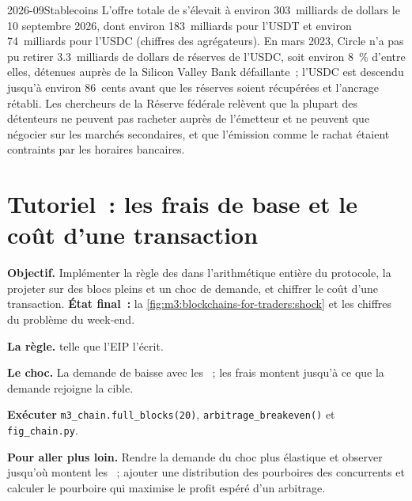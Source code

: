 \begin{dated}{2026-09}{Stablecoins}\label{dat:m3:blockchains-for-traders:stable}
L'offre totale de  s'élevait à environ 303~milliards de dollars le 10 septembre 2026, dont environ 183~milliards pour l'USDT et
environ 74~milliards pour l'USDC (chiffres des agrégateurs). En mars 2023, Circle n'a pas pu retirer 3.3~milliards de dollars de réserves de l'USDC,
soit environ 8~\% d'entre elles, détenues auprès de la Silicon Valley Bank défaillante~; l'USDC est descendu jusqu'à environ 86~cents avant que
les réserves soient récupérées et l'ancrage rétabli. Les chercheurs de la Réserve fédérale relèvent que la plupart des détenteurs
ne peuvent pas racheter auprès de l'émetteur et ne peuvent que négocier sur les marchés secondaires, et que l'émission comme le rachat étaient contraints
par les horaires bancaires.
\end{dated}

\section{Tutoriel~: les frais de base et le coût d'une transaction}\label{tut:m3:blockchains-for-traders:gas}

\begin{tutorial}
\textbf{Objectif.} Implémenter la règle des  dans l'arithmétique entière du protocole, la projeter sur des blocs pleins
et un choc de demande, et chiffrer le coût d'une transaction. \textbf{État final~:}
la \cref{fig:m3:blockchains-for-traders:shock} et les chiffres du problème du week-end.
\begin{tutsteps}
\item \textbf{La règle.}  telle que l'EIP l'écrit.
\label{lst:m3:blockchains-for-traders:basefee}
\item \textbf{Le choc.} La demande de  baisse avec les ~; les frais montent jusqu'à ce que la demande rejoigne la cible.
\label{lst:m3:blockchains-for-traders:shock}
\item \textbf{Exécuter} \texttt{m3\_chain.full\_blocks(20)}, \texttt{arbitrage\_breakeven()} et \texttt{fig\_chain.py}.
\end{tutsteps}
\textbf{Pour aller plus loin.} Rendre la demande du choc plus élastique et observer jusqu'où montent les ~; ajouter une
distribution des pourboires des concurrents et calculer le pourboire qui maximise le profit espéré d'un arbitrage.
\end{tutorial}

